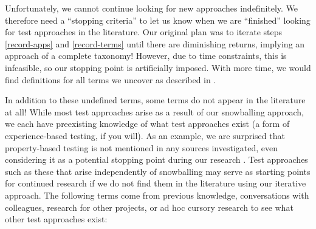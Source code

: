 Unfortunately, we cannot continue looking for new approaches indefinitely. We
therefore need a ``stopping criteria'' to let us know when we are ``finished''
looking for test approaches in the literature. Our original plan was to iterate
steps \ref{record-apps} and \ref{record-terms} until there are diminishing
returns, implying an approach of a complete taxonomy! However, due to time
constraints, this is infeasible, so our stopping point is artificially imposed.
With more time, we would find definitions for all terms we uncover as described
in .

\ifnotpaper
    In addition to these undefined terms, some terms do not appear in
    the literature at all! While most test approaches arise as a result of our
    snowballing approach, we each have preexisting knowledge of what test
    approaches exist (a form of experience-based testing, if you will).
    As an example, we are surprised that property-based testing is not mentioned
    in any sources investigated, even considering it as a potential stopping point
    during our research%
    . Test approaches such as these that arise independently of snowballing
    may serve as starting points for continued research if we do not find
    them in the literature using our iterative approach. The following terms come
    from previous knowledge, conversations with colleagues, research for other
    projects, or ad hoc cursory research to see what other test approaches exist:
    \newline

